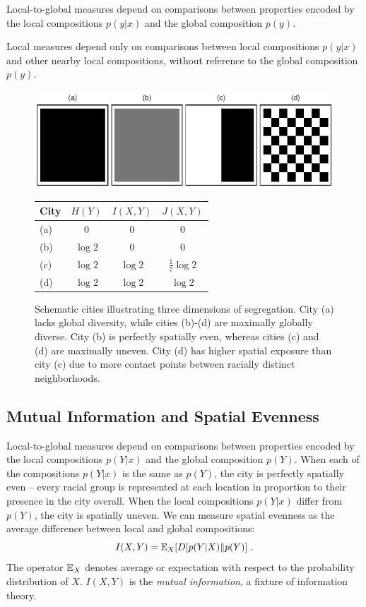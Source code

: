\documentclass[9pt,twocolumn,twoside]{pnas-new}
\begin{document}
	Local-to-global measures depend on comparisons between properties encoded by the local compositions $p(y|x)$ and the global composition $p(y)$. 

	Local measures depend only on comparisons between local compositions $p(y|x)$ and other nearby local compositions, without reference to the global composition $p(y)$. 
\begin{figure}%
		\centering %
		\includegraphics[width=\linewidth]{figs/checkerboard.pdf}
		\begin{tabular}{l | c c c} 
		City & $H(Y)$ & $I(X,Y)$ & $J(X,Y)$ \\
		\hline
		(a) & $0$        & $0$        & $0$\\
		(b) & $\log 2$ & $0$        & $0$\\
		(c) & $\log 2$ & $\log 2$ & $\frac{1}{7} \log 2$\\
		(d) & $\log 2$ & $\log 2$ & $\log 2$
		\end{tabular}
		\caption{
			Schematic cities illustrating three dimensions of segregation. 
			City (a) lacks global diversity, while cities (b)-(d) are maximally globally diverse. 
			City (b) is perfectly spatially even, whereas cities (c) and (d) are maximally uneven. 
			City (d) has higher spatial exposure than city (c) due to more contact points between racially distinct neighborhoods.
		} \label{fig:checkerboard}
	\end{figure}
\subsection*{Mutual Information and Spatial Evenness}
	Local-to-global measures depend on comparisons between properties encoded by the local compositions $p(Y|x)$ and the global composition $p(Y)$. 
	When each of the compositions $p(Y|x)$ is the same as $p(Y)$, the city is perfectly spatially even -- every racial group is represented at each location in proportion to their presence in the city overall. 
	When the local compositions $p(Y|x)$ differ from $p(Y)$, the city is spatially uneven. 
	We can measure spatial evenness as the average difference between local and global compositions: 
	\begin{equation}
		I(X,Y) = \mathbb{E}_X[D[p(Y|X)\|p(Y)]\;.
	\end{equation}
	The operator $\mathbb{E}_X$ denotes average or expectation with respect to the probability distribution of $X$. 
	$I(X,Y)$ is the \emph{mutual information}, a fixture of information theory. \cite{Bettencourt2015} 
\end{document}
